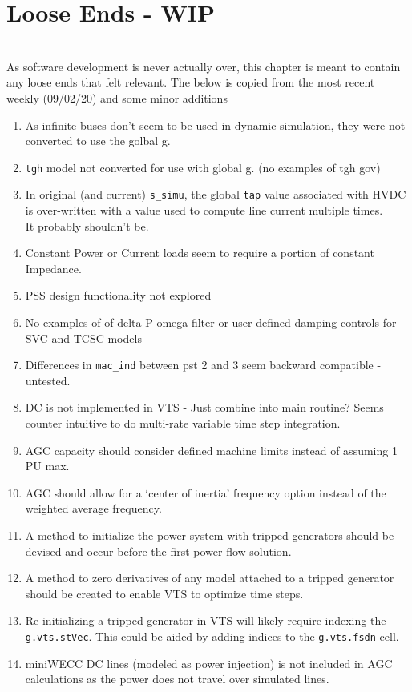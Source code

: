 \chapter{Loose Ends - WIP} \ \\
As software development is never actually over, this chapter is meant to contain any loose ends that felt relevant.
The below is copied from the most recent weekly (09/02/20) and some minor additions

\begin{enumerate}
	\item As infinite buses don't seem to be used in dynamic simulation, they were not converted to use the golbal g.
	\item \verb|tgh| model not converted for use with global g. (no examples of tgh gov)
	\item In original (and current) \verb|s_simu|, the global \verb|tap| value associated with HVDC is over-written with  a value used to compute line current multiple times. \\It probably shouldn't be.
	\item Constant Power or Current loads seem to require a portion of constant Impedance.
	\item PSS design functionality not explored
	\item No examples of of delta P omega filter or user defined damping controls for SVC and TCSC models
	\item Differences in \verb|mac_ind| between pst 2 and 3 seem backward compatible - untested.
	\item DC is not implemented in VTS - Just combine into main routine? Seems counter intuitive to do multi-rate variable time step integration.
	\item AGC capacity should consider defined machine limits instead of assuming 1 PU max.
	\item AGC should allow for a `center of inertia' frequency option instead of the weighted average frequency.
	\item A method to initialize the power system with tripped generators should be devised and occur before the first power flow solution.
	\item A method to zero derivatives of any model attached to a tripped generator should be created to enable VTS to optimize time steps.
	\item Re-initializing a tripped generator in VTS will likely require indexing the \verb|g.vts.stVec|. This could be aided by adding indices to the \verb|g.vts.fsdn| cell.
	\item miniWECC DC lines (modeled as power injection) is not included in AGC calculations as the power does not travel over simulated lines.
\end{enumerate}

